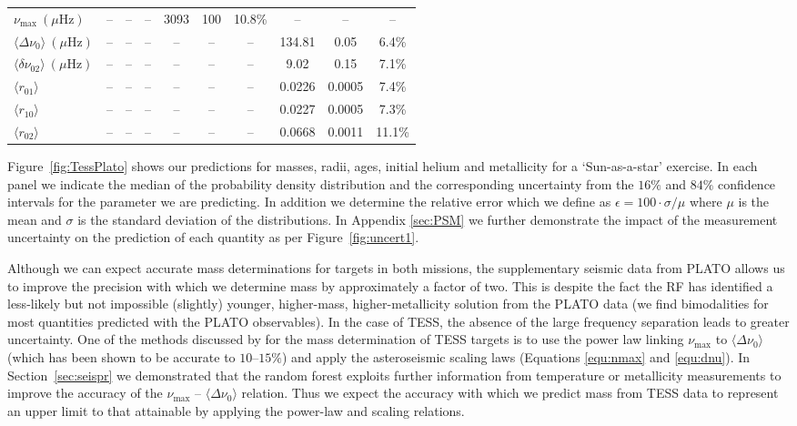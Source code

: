 {\begin{landscape}
\begin{table}
\begin{tabular}{l|ccc|ccc|ccc}
$\nu_{\max} \ (\mu \text{Hz})$  & -- & -- & -- &3093 &100 &10.8\% & -- &-- & --\\
$\langle\Delta\nu_0\rangle  \ (\mu \text{Hz})$  & -- & -- & -- & -- & -- & -- &134.81 &0.05 &6.4\%\\
$\langle\delta\nu_{02}\rangle  \ (\mu \text{Hz})$  & -- & -- & -- & -- & -- & -- &9.02 &0.15 &7.1\% \\
$\langle r_{01}\rangle$ & -- & -- & -- & -- & -- & -- &0.0226 &0.0005 &7.4\%\\
$\langle r_{10}\rangle$ & -- & -- & -- & -- & -- & -- &0.0227 &0.0005 &7.3\% \\
$\langle r_{02}\rangle$& -- & -- & -- & -- & -- & -- &0.0668 &0.0011 & 11.1\%
\end{tabular}
\end{table}
%
%
\end{landscape}
%
%
}
%


Figure~\ref{fig:TessPlato} shows our predictions for masses, radii, ages, initial helium and metallicity for a `Sun-as-a-star' exercise. In each panel we indicate the median of the probability density distribution and the corresponding  uncertainty from the $16\%$ and $84\%$ confidence intervals for the parameter we are predicting. In addition we determine the relative error which we define as ${\epsilon = 100 \cdot \sigma/\mu}$  where $\mu$ is the mean and $\sigma$ is the standard deviation of the distributions. In Appendix \ref{sec:PSM} we further demonstrate the impact of the measurement uncertainty on the prediction of each quantity as per Figure~\ref{fig:uncert1}.


Although we can expect accurate mass determinations for targets in both missions, the supplementary seismic data from PLATO allows us to improve the precision with which we determine mass by approximately a factor of two. This is despite the fact the RF has identified a less-likely but not impossible (slightly) younger, higher-mass, higher-metallicity solution from the  PLATO  data (we find bimodalities for most quantities predicted with the PLATO observables). In the case of TESS, the absence of the large frequency separation leads to greater uncertainty. One of the methods discussed  by \citet{2016ApJ...830..138C} for the mass determination of TESS targets is to use the power law linking $\nu_{\max}$ to ${\langle\Delta\nu_0\rangle}$ (which has been shown to be accurate to $10$--$15\%$) and apply the asteroseismic scaling laws (Equations \ref{equ:nmax} and \ref{equ:dnu}).  In Section~\ref{sec:seispr} we demonstrated that the random forest exploits further information from  temperature or metallicity measurements to improve the accuracy of the $\nu_{\max}$ -- ${\langle\Delta\nu_0\rangle}$ relation.  Thus we expect the accuracy with which we predict mass from TESS data to represent an upper limit to that attainable by  applying the power-law and scaling relations. 

